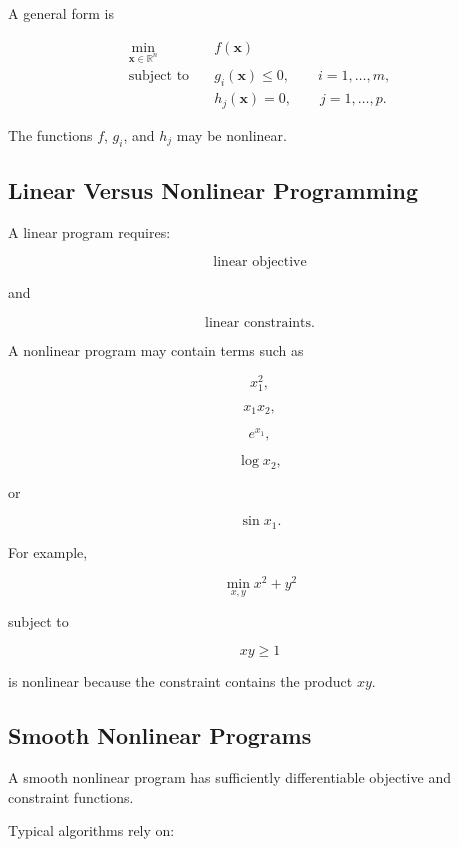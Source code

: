 A general form is

\[
\boxed{
\begin{aligned}
\min_{\mathbf{x}\in\mathbb{R}^n}
\quad&
f(\mathbf{x})
\\
\text{subject to}
\quad&
g_i(\mathbf{x})\leq0,
\qquad
i=1,\ldots,m,
\\
&
h_j(\mathbf{x})=0,
\qquad
j=1,\ldots,p.
\end{aligned}
}
\]

The functions \(f\), \(g_i\), and \(h_j\) may be nonlinear.

\subsection{Linear Versus Nonlinear Programming}
\label{subsec:linear-versus-nonlinear-programming}

A linear program requires:

\[
\boxed{
\text{linear objective}
}
\]

and

\[
\boxed{
\text{linear constraints}.
}
\]

A nonlinear program may contain terms such as

\[
x_1^2,
\]

\[
x_1x_2,
\]

\[
e^{x_1},
\]

\[
\log x_2,
\]

or

\[
\sin x_1.
\]

For example,

\[
\boxed{
\min_{x,y}
x^2+y^2
}
\]

subject to

\[
\boxed{
xy\geq1
}
\]

is nonlinear because the constraint contains the product \(xy\).

\subsection{Smooth Nonlinear Programs}
\label{subsec:smooth-nonlinear-programs}

A smooth nonlinear program has sufficiently differentiable objective and
constraint functions.

Typical algorithms rely on:


